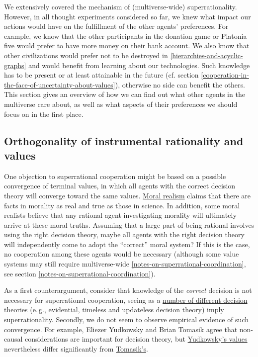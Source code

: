 We extensively covered the mechanism of (multiverse-wide)
superrationality. However, in all thought experiments considered so far,
we knew what impact our actions would have on the fulfillment of the
other agents' preferences. For example, we know that the other
participants in the donation game or Platonia five would prefer to have
more money on their bank account. We also know that other civilizations
would prefer not to be destroyed in
\ref{hierarchies-and-acyclic-graphs} and would benefit from learning about our technologies. Such
knowledge has to be present or at least attainable in the future (cf.
section
\ref{cooperation-in-the-face-of-uncertainty-about-values}),
otherwise no side can benefit the others. This section gives an overview
of how we can find out what other agents in the multiverse care about,
as well as what aspects of their preferences we should focus on in the
first place.

\hypertarget{orthogonality-of-instrumental-rationality-and-values}{\subsection{Orthogonality
of instrumental rationality and
values}\label{orthogonality-of-instrumental-rationality-and-values}}

One objection to superrational cooperation might be based on a possible
convergence of terminal values, in which all agents with the correct
decision theory will converge toward the same values.
\href{https://en.wikipedia.org/wiki/Moral_realism}{Moral realism}
claims that there are facts in morality as real and true as those in
science. In addition, some moral realists believe that any rational
agent investigating morality will ultimately arrive at these moral
truths. Assuming that a large part of being rational involves using the
right decision theory, maybe all agents with the right decision theory
will independently come to adopt the ``correct'' moral system? If this
is the case, no cooperation among these agents would be necessary
(although some value systems may still require multiverse-wide
\ref{notes-on-superrational-coordination},
see section
\ref{notes-on-superrational-coordination}).

As a first counterargument, consider that knowledge of the
\emph{correct} decision is not necessary for superrational cooperation,
seeing as a
\href{https://casparoesterheld.com/a-comprehensive-list-of-decision-theories/}{number
of different decision theories} (e.\,g.,
\href{https://en.wikipedia.org/wiki/Evidential_decision_theory}{evidential},
\href{https://intelligence.org/files/TDT.pdf}{timeless} and
\href{https://wiki.lesswrong.com/wiki/Updateless_decision_theory}{updateless}
decision theory) imply superrationality. Secondly, we do not seem to
observe empirical evidence of such convergence. For example, Eliezer
Yudkowsky and Brian Tomasik agree that non-causal considerations are
important for decision theory, but
\href{https://wiki.lesswrong.com/wiki/Fun_theory}{Yudkowsky's
values} nevertheless differ significantly from
\href{http://reducing-suffering.org/\#Ethics}{Tomasik's}.

